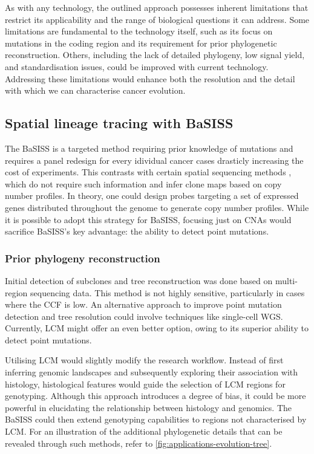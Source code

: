 As with any technology, the outlined approach possesses inherent limitations that restrict its applicability and the range of biological questions it can address. Some limitations are fundamental to the technology itself, such as its focus on mutations in the coding region and its requirement for prior phylogenetic reconstruction. Others, including the lack of detailed phylogeny, low signal yield, and standardisation issues, could be improved with current technology. Addressing these limitations would enhance both the resolution and the detail with which we can characterise cancer evolution.

\subsection{Spatial lineage tracing with \acs{BaSISS}}

The \ac{BaSISS} is a targeted method requiring prior knowledge of mutations and requires a panel redesign for every idividual cancer cases drasticly increasing the cost of experiments. This contrasts with certain spatial sequencing methods \parencite{Zhao2022-xd,Erickson2022-zh}, which do not require such information and infer clone maps based on copy number profiles. In theory, one could design probes targeting a set of expressed genes distributed throughout the genome to generate copy number profiles. While it is possible to adopt this strategy for \ac{BaSISS}, focusing just on \acp{CNA} would sacrifice \ac{BaSISS}'s key advantage: the ability to detect point mutations.

\subsubsection*{Prior phylogeny reconstruction}
Initial detection of subclones and tree reconstruction was done based on multi-region sequencing data. This method is not highly sensitive, particularly in cases where the \ac{CCF} is low. An alternative approach to improve point mutation detection and tree resolution could involve techniques like single-cell \ac{WGS}. Currently, \ac{LCM} might offer an even better option, owing to its superior ability to detect point mutations.

Utilising \ac{LCM} would slightly modify the research workflow. Instead of first inferring genomic landscapes and subsequently exploring their association with histology, histological features would guide the selection of \ac{LCM} regions for genotyping. Although this approach introduces a degree of bias, it could be more powerful in elucidating the relationship between histology and genomics. The \ac{BaSISS} could then extend genotyping capabilities to regions not characterised by \ac{LCM}. For an illustration of the additional phylogenetic details that can be revealed through such methods, refer to \cref{fig:applications-evolution-tree}.

